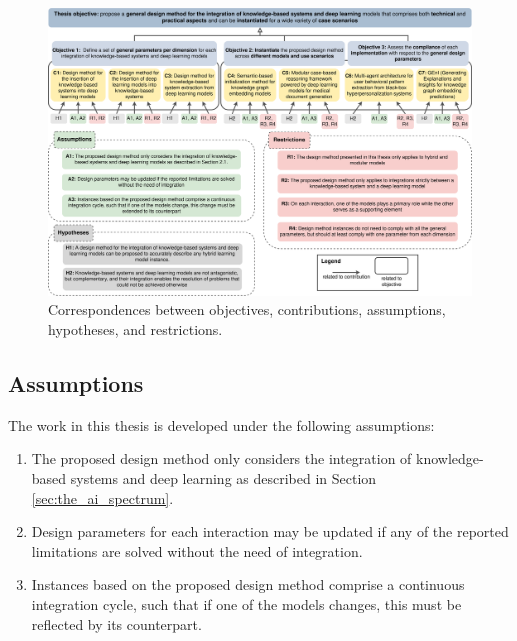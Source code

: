 \begin{figure}
  \centering
  \includegraphics[width=\linewidth]{3_objectives/figures/methodology_general.eps}
  \caption{Correspondences between objectives, contributions, assumptions, hypotheses, and restrictions.}
  \label{fig:methodology_general}
\end{figure}

\subsection{Assumptions}
The work in this thesis is developed under the following assumptions:
\begin{enumerate}[start=1,label={\bfseries A\arabic*:}]
    \item The proposed design method only considers the integration of knowledge-based systems and deep learning as described in Section \ref{sec:the_ai_spectrum}.
    \item Design parameters for each interaction may be updated if any of the reported limitations are solved without the need of integration.
    \item Instances based on the proposed design method comprise a continuous integration cycle, such that if one of the models changes, this must be reflected by its counterpart.
\end{enumerate}

